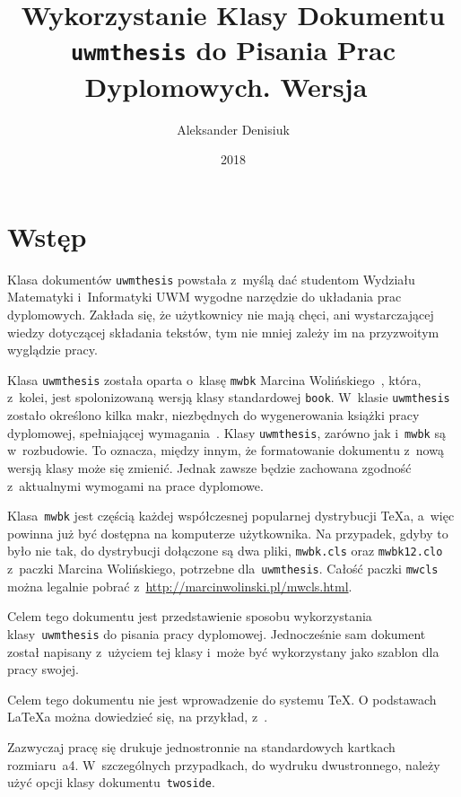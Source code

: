 \documentclass[wmii, inf, mgr]{uwmthesis}
\date{2018}
\title{Wykorzystanie Klasy Dokumentu \texttt{uwmthesis} do Pisania Prac Dyplomowych. Wersja~\version}
\author{Aleksander Denisiuk}
\begin{document}
\maketitle

\tableofcontents



\chapter*{Wstęp}

Klasa dokumentów \texttt{uwmthesis} powstała z~myślą dać studentom Wydziału Matematyki i~Informatyki UWM wygodne narzędzie do układania prac dyplomowych. Zakłada się, że użytkownicy nie mają chęci, ani wystarczającej wiedzy dotyczącej składania tekstów, tym nie mniej zależy im na przyzwoitym wyglądzie pracy.


Klasa \texttt{uwmthesis} została oparta o~klasę \texttt{mwbk} Marcina Wolińskiego~\cite{Wolinski}, która, z~kolei, jest spolonizowaną wersją klasy standardowej \texttt{book}. W~klasie \texttt{uwmthesis} zostało określono kilka makr, niezbędnych do wygenerowania książki pracy dyplomowej, spełniającej wymagania~\cite{UWM}. Klasy \texttt{uwmthesis}, zarówno jak i~\texttt{mwbk} są w~rozbudowie. To oznacza, między innym, że formatowanie dokumentu z~nową wersją klasy może się zmienić. Jednak zawsze będzie zachowana zgodność z~aktualnymi wymogami na prace dyplomowe.

Klasa~\texttt{mwbk} jest częścią każdej współczesnej popularnej dystrybucji \TeX a, a~więc powinna już być dostępna na komputerze użytkownika. Na przypadek, gdyby to było nie tak, do dystrybucji dołączone są dwa pliki, \texttt{mwbk.cls} oraz \texttt{mwbk12.clo} z~paczki Marcina Wolińskiego, potrzebne dla~\texttt{uwmthesis}. Całość paczki \texttt{mwcls} można legalnie pobrać z~\url{http://marcinwolinski.pl/mwcls.html}.

Celem tego dokumentu jest przedstawienie sposobu wykorzystania klasy~\texttt{uwmthesis} do pisania pracy dyplomowej. Jednocześnie sam dokument został napisany z~użyciem tej klasy i~może być wykorzystany jako szablon dla pracy swojej.

Celem tego dokumentu nie jest wprowadzenie do systemu \TeX. O podstawach \LaTeX a można dowiedzieć się, na przykład, z~\cite{Oetker}.

Zazwyczaj pracę się drukuje jednostronnie na standardowych kartkach rozmiaru~a4. W~szczególnych przypadkach, do wydruku dwustronnego, należy użyć opcji klasy dokumentu~\texttt{twoside}.
\end{document}
